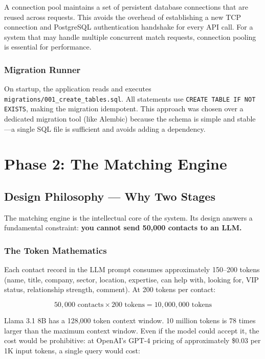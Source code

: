 \documentclass[12pt, a4paper]{report}
\begin{document}
A connection pool maintains a set of persistent database connections that are reused across requests. This avoids the overhead of establishing a new TCP connection and PostgreSQL authentication handshake for every API call. For a system that may handle multiple concurrent match requests, connection pooling is essential for performance.

\subsection{Migration Runner}

On startup, the application reads and executes \texttt{migrations/001\_create\_tables.sql}. All statements use \texttt{CREATE TABLE IF NOT EXISTS}, making the migration idempotent. This approach was chosen over a dedicated migration tool (like Alembic) because the schema is simple and stable---a single SQL file is sufficient and avoids adding a dependency.

\chapter{Phase 2: The Matching Engine}

\section{Design Philosophy --- Why Two Stages}

The matching engine is the intellectual core of the system. Its design answers a fundamental constraint: \textbf{you cannot send 50,000 contacts to an LLM.}

\subsection{The Token Mathematics}

Each contact record in the LLM prompt consumes approximately 150--200 tokens (name, title, company, sector, location, expertise, can help with, looking for, VIP status, relationship strength, comment). At 200 tokens per contact:

\[
50,000 \text{ contacts} \times 200 \text{ tokens} = 10,000,000 \text{ tokens}
\]

Llama 3.1 8B has a 128,000 token context window. 10 million tokens is 78 times larger than the maximum context window. Even if the model could accept it, the cost would be prohibitive: at OpenAI's GPT-4 pricing of approximately \$0.03 per 1K input tokens, a single query would cost:
\end{document}

